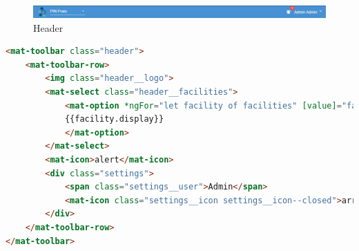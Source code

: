 \begin{figure}[H]
    \centering  
    \caption{Header}
    \includegraphics[scale=0.4]{img/cap3/header}
\end{figure}

\begin{lstlisting}[language=html]
<mat-toolbar class="header">
    <mat-toolbar-row>
        <img class="header__logo">
        <mat-select class="header__facilities">
            <mat-option *ngFor="let facility of facilities" [value]="facility.value">
            {{facility.display}}
            </mat-option>
        </mat-select>
        <mat-icon>alert</mat-icon>
        <div class="settings">
            <span class="settings__user">Admin</span>
            <mat-icon class="settings__icon settings__icon--closed">arrow-down</mat-icon>
        </div>
    </mat-toolbar-row>
</mat-toolbar>
\end{lstlisting}

